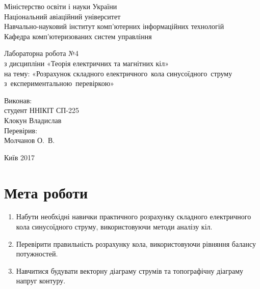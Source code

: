\documentclass[a4paper,oneside,DIV=12,12pt]{scrartcl}
\begin{document}
	\begin{titlepage}
		\begin{center}
			Міністерство освіти і науки України\\
			Національний авіаційний університет\\
			Навчально-науковий інститут комп'ютерних інформаційних технологій\\
			Кафедра комп'ютеризованих систем управління
			
			\vspace{\fill}
				Лабораторна робота №4\\
				з дисципліни «Теорія електричних та магнітних кіл»\\
				на тему: «Розрахунок складного електричного~кола синусоїдного~струму з~експериментальною~перевіркою»\\
				
			\vspace{\fill}
			
			\begin{flushright}
				Виконав:\\
				студент ННІКІТ СП-225\\
				Клокун Владислав\\
				Перевірив:\\
				Молчанов О.~В.
			\end{flushright}
			Київ 2017
		\end{center}
	\end{titlepage}
	
	\section{Мета роботи}
		\begin{enumerate}
			\item Набути необхідні навички практичного розрахунку складного електричного кола синусоїдного струму, використовуючи методи аналізу кіл.
			\item Перевірити правильність розрахунку кола, використовуючи рівняння балансу потужностей.
			\item Навчитися будувати векторну діаграму струмів та топографічну діаграму напруг контуру.
		\end{enumerate}
		
		
\end{document}
